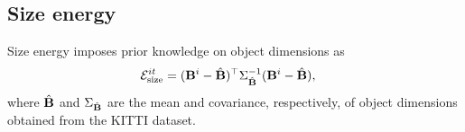 \documentclass[10pt,twocolumn,letterpaper]{article}
\begin{document}
\subsection{Size energy}
Size energy imposes prior knowledge on object dimensions as
\begin{align}
  \label{eq:totalSizeEnergy}
  \mathcal{E}^{it}_{\text{size}} &= (\mathbf{B}^{i} - \hat{\mathbf{B}})^\top\Sigma_{\hat{\mathbf{B}}}^{-1}(\mathbf{B}^{i} -
  \hat{\mathbf{B}}),
\end{align}
where $\hat{\mathbf{B}}$ and $\Sigma_{\hat{\mathbf{B}}}$ are the mean and covariance, respectively, of object dimensions obtained from the KITTI dataset.

\begin{comment}
\section{Inference method Comparison}

We use two methods for inference, Metropolic Hastings and block coordinate descent. We briefly describe the inference algorithms for completeness.

\subsection{Metropolis Hastings}
Metropolis Hastings requires a \emph{transition probability} $Q(\map'|
\map^r)$, that depends on current sample $\map^r$ and guides
the random walk in the high-dimensional space. We randomly sample a point
$\map'$ from from $Q(.)$ and it is either accepted or rejected based on the
\emph{acceptance probability} $a$:
\begin{align}
  a = \frac{P(\map')Q(\map^r| \map')}
  {P(\map^r)Q(\map'| \map^r)}
  \enspace,
\end{align}
where $P(\map)$ is joint probability of the model at point $\map$.

If $a \ge 1$, then the new point $\map'$ is accepted otherwise it is accepted
with probability $a$. Here acceptance means that the point in the next
iteration is taken as the sampled point otherwise the earlier point is retained.

\subsection{Block Coordinate Descent}

We use block coordinate descent algorithm on our factor graph, by iteratively
minimizing the energy with respect to only a subset (block) of random 
variables. We choose to divide the blocks along the
variable types like dimension, yaw and position. Hence we iteratively minimize the energies with respect to dimension variables, then with respect to yaw variables and then with respect to position variables. Since we know the dependence of parts of our energy on specific variables, thanks to factor graph formulation, we can minimize the energies corresponding to the given set of variables.


\end{comment}
\end{document}
